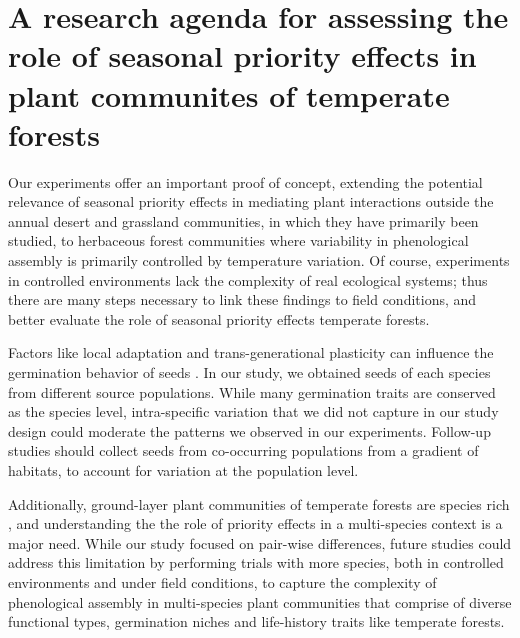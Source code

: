 \documentclass{article}[11pt]
\begin{document}
\section*{A research agenda for assessing the role of seasonal priority effects in plant communites of temperate forests}

Our experiments offer an important proof of concept, extending the potential relevance of seasonal priority effects in mediating plant interactions outside the annual desert and grassland communities, in which they have primarily been studied, to herbaceous forest communities where variability in phenological assembly is primarily controlled by temperature variation. Of course, experiments in controlled environments lack the complexity of real ecological systems; thus there are many steps necessary to link these findings to field conditions, and better evaluate the role of seasonal priority effects temperate forests.

Factors like local adaptation and trans-generational plasticity can influence the germination behavior of seeds \citep{Donohue:2010uy,Baughman:2019ty}. In our study, we obtained seeds of each species from different source populations. While many germination traits are conserved as the species level, intra-specific variation that we did not capture in our study design could moderate the patterns we observed in our experiments. Follow-up studies should collect seeds from co-occurring populations from a gradient of habitats, to account for variation at the population level.

Additionally, ground-layer plant communities of temperate forests are species rich \citep{Whigham:2004wy}, and understanding the the role of priority effects in a multi-species context is a major need. While our study focused on pair-wise differences, future studies could address this limitation by performing trials with more species, both in controlled environments and under field conditions, to capture the complexity of phenological assembly in multi-species plant communities that comprise of diverse functional types, germination niches and life-history traits like temperate forests.
\end{document}
